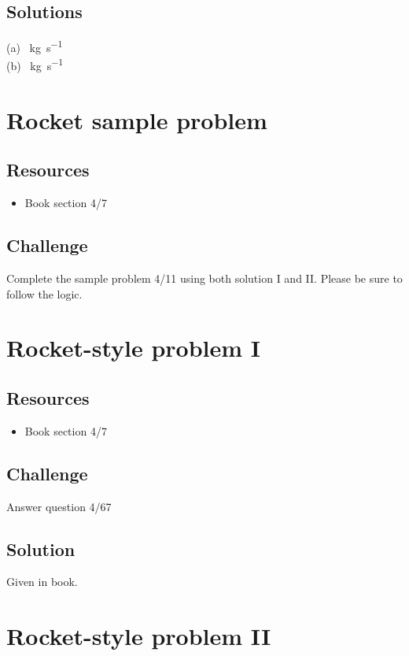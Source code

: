 \subsection*{Solutions}
(a)  \SI{}{\kg\per\second} \\
(b)  \SI{}{\kg\per\second}




\newpage
\section{Rocket sample problem}

\subsection*{Resources}
\begin{itemize}
    \item Book section 4/7
\end{itemize}

\subsection*{Challenge}
Complete the sample problem 4/11 using both solution I and II. Please be sure to follow the logic.




\newpage
\section{Rocket-style problem I}

\subsection*{Resources}
\begin{itemize}
    \item Book section 4/7
\end{itemize}

\subsection*{Challenge}
Answer question 4/67

\subsection*{Solution}
Given in book.




\newpage
\section{Rocket-style problem II}

